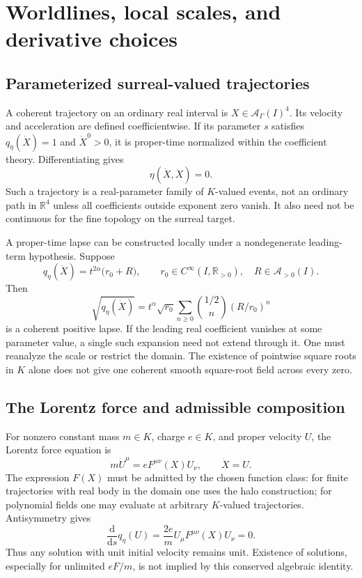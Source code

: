 \documentclass[11pt,letterpaper]{article}
\theoremstyle{definition}
\theoremstyle{remark}
\newcommand{\R}{\mathbb R}\newcommand{\C}{\mathbb C}
\newcommand{\A}{\mathscr A}\newcommand{\OO}{\mathcal O}\newcommand{\mm}{\mathfrak m}
\newcommand{\dd}{\mathrm d}
\begin{document}
\section{Worldlines, local scales, and derivative choices}\label{vtf:mink:sec:worldlines}

\subsection{Parameterized surreal-valued trajectories}
A coherent trajectory on an ordinary real interval is $X\in\A_\Gamma(I)^4$. Its velocity and acceleration are defined coefficientwise. If its parameter $s$ satisfies $q_\eta(\dot X)=1$ and $\dot X^0>0$, it is proper-time normalized within the coefficient theory. Differentiating gives
\begin{equation}
 \eta(\dot X,\ddot X)=0.
\end{equation}
Such a trajectory is a real-parameter family of $K$-valued events, not an ordinary path in $\R^4$ unless all coefficients outside exponent zero vanish. It also need not be continuous for the fine topology on the surreal target.

A proper-time lapse can be constructed locally under a nondegenerate leading-term hypothesis. Suppose
\begin{equation}
 q_\eta(\dot X)=t^{2\alpha}\bigl(r_0+R\bigr),
 \qquad r_0\in C^\infty(I,\R_{>0}),\quad R\in\A_{>0}(I).
\end{equation}
Then
\begin{equation}
 \sqrt{q_\eta(\dot X)}
 =t^\alpha\sqrt{r_0}
 \sum_{n\geq0}\binom{1/2}{n}(R/r_0)^n
\end{equation}
is a coherent positive lapse. If the leading real coefficient vanishes at some parameter value, a single such expansion need not extend through it. One must reanalyze the scale or restrict the domain. The existence of pointwise square roots in $K$ alone does not give one coherent smooth square-root field across every zero.

\subsection{The Lorentz force and admissible composition}
For nonzero constant mass $m\in K$, charge $e\in K$, and proper velocity $U$, the Lorentz force equation is
\begin{equation}\label{vtf:mink:eq:Lorentzforce}
 m\dot U^\mu=eF^{\mu\nu}(X)U_\nu,
 \qquad \dot X=U.
\end{equation}
The expression $F(X)$ must be admitted by the chosen function class: for finite trajectories with real body in the domain one uses the halo construction; for polynomial fields one may evaluate at arbitrary $K$-valued trajectories. Antisymmetry gives
\begin{equation}
 \frac{\dd}{\dd s}q_\eta(U)=\frac{2e}{m}U_\mu F^{\mu\nu}(X)U_\nu=0.
\end{equation}
Thus any solution with unit initial velocity remains unit. Existence of solutions, especially for unlimited $eF/m$, is not implied by this conserved algebraic identity.
\end{document}
